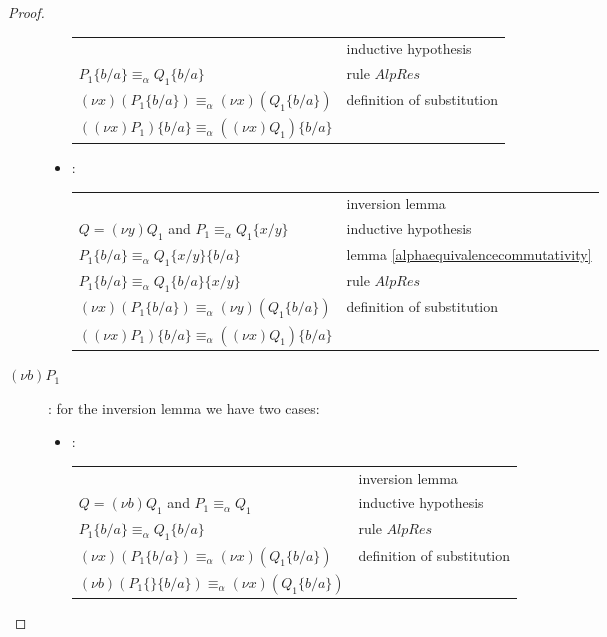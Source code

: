 \begin{proof}
\begin{description}
\begin{itemize}
\begin{center}
\begin{tabular}{ll}
		  &
		    inductive hypothesis
		\\
		    $P_{1}\{b/a\}\equiv_{\alpha} Q_{1}\{b/a\}$
		  &
		    rule $AlpRes$
		\\
		    $(\nu x)(P_{1}\{b/a\})\equiv_{\alpha} (\nu x)(Q_{1}\{b/a\})$
		  &
		    definition of substitution
		\\
		    $((\nu x)P_{1})\{b/a\}\equiv_{\alpha} ((\nu x)Q_{1})\{b/a\}$
		  &
		\\
	      \end{tabular}
	    \end{center}	
	  \item:
	    \begin{center}
	      \begin{tabular}{ll}
		  &
		    inversion lemma 
		\\
		    $Q=(\nu y) Q_{1}$ and $P_{1}\equiv_{\alpha}Q_{1}\{x/y\}$ 
		  &
		    inductive hypothesis
		\\
		    $P_{1}\{b/a\}\equiv_{\alpha} Q_{1}\{x/y\}\{b/a\}$
		  &
		    lemma \ref{alphaequivalencecommutativity}
		\\
		    $P_{1}\{b/a\}\equiv_{\alpha} Q_{1}\{b/a\}\{x/y\}$
		  &
		    rule $AlpRes$
		\\
		    $(\nu x)(P_{1}\{b/a\})\equiv_{\alpha} (\nu y)(Q_{1}\{b/a\})$
		  &
		    definition of substitution
		\\
		    $((\nu x)P_{1})\{b/a\}\equiv_{\alpha} ((\nu x)Q_{1})\{b/a\}$
		  &
		\\
	      \end{tabular}
	    \end{center}	
	\end{itemize}
      \item[$(\nu b)P_{1}$]:
	for the inversion lemma we have two cases:
	\begin{itemize}
	  \item:
	    \begin{center}
	      \begin{tabular}{ll}
		  &
		    inversion lemma 
		\\
		    $Q=(\nu b) Q_{1}$ and $P_{1}\equiv_{\alpha}Q_{1}$ 
		  &
		    inductive hypothesis
		\\
		    $P_{1}\{b/a\}\equiv_{\alpha} Q_{1}\{b/a\}$
		  &
		    rule $AlpRes$
		\\
		    $(\nu x)(P_{1}\{b/a\})\equiv_{\alpha} (\nu x)(Q_{1}\{b/a\})$
		  &
		    definition of substitution
		\\
		    $(\nu b)(P_{1}\{\}\{b/a\})\equiv_{\alpha} (\nu x)(Q_{1}\{b/a\})$

\end{tabular}
\end{center}
\end{itemize}
\end{description}
\end{proof}
